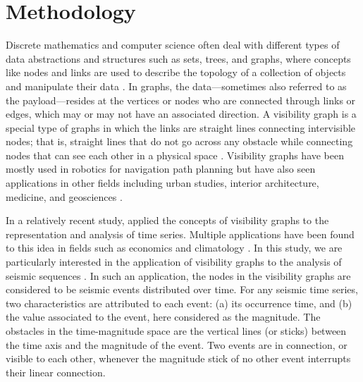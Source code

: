 
\section{Methodology}
\label{sec:methodology}

Discrete mathematics and computer science often deal with different types of data abstractions and structures such as sets, trees, and graphs, where concepts like nodes and links are used to describe the topology of a collection of objects and manipulate their data \citep[e.g.,][]{Skiena_2008_Book}. In graphs, the data---sometimes also referred to as the payload---resides at the vertices or nodes who are connected through links or edges, which may or may not have an associated direction. A visibility graph is a special type of graphs in which the links are straight lines connecting intervisible nodes; that is, straight lines that do not go across any obstacle while connecting nodes that can see each other in a physical space \citep{LozanoPerez_1979_CACM}. Visibility graphs have been mostly used in robotics for navigation path planning \citep[e.g.,][]{Huang_2004_Proc, Oommen_1987_JRA} but have also seen applications in other fields including urban studies, interior architecture, medicine, and geosciences \citep[e.g.,][]{Raman_2010_UE, Ahmadlou_2010_JNT, Varoudis_2014_JSS, Phillips_2015_ESR}.

In a relatively recent study, \citet{Lacasa2008} applied the concepts of visibility graphs to the representation and analysis of time series. Multiple applications have been found to this idea in fields such as economics \citep{Yang_2009_PA, Wang2012} and climatology \citep{Elsner_2009_GRL}. In this study, we are particularly interested in the application of visibility graphs to the analysis of seismic sequences \citep{Telesca2012}. In such an application, the nodes in the visibility graphs are considered to be seismic events distributed over time. For any seismic time series, two characteristics are attributed to each event: (a) its occurrence time, and (b) the value associated to the event, here considered as the magnitude. The obstacles in the time-magnitude space are the vertical lines (or sticks) between the time axis and the magnitude of the event. Two events are in connection, or visible to each other, whenever the magnitude stick of no other event interrupts their linear connection.

